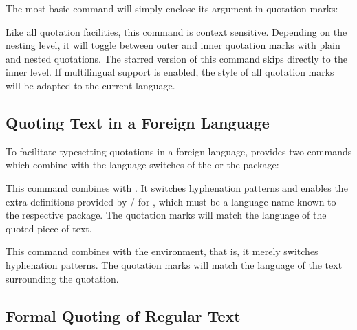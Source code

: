\documentclass{ltxdockit}[2010/09/26]
\begin{document}
The most basic command will simply enclose its argument in quotation marks:

\begin{ltxsyntax}


Like all quotation facilities, this command is context sensitive. Depending on the nesting level, it will toggle between outer and inner quotation marks with plain and nested quotations. The starred version of this command skips directly to the inner level. If multilingual support is enabled, the style of all quotation marks will be adapted to the current language.

\end{ltxsyntax}

\subsection{Quoting Text in a Foreign Language}
\label{bas:bbl}

To facilitate typesetting quotations in a foreign language,  provides two commands which combine  with the language switches of the  or the  package:

\begin{ltxsyntax}


This command combines  with . It switches hyphenation patterns and enables the extra definitions provided by \slash{} for , which must be a language name known to the respective package. The quotation marks will match the language of the quoted piece of text.


This command combines  with the  environment, that is, it merely switches hyphenation patterns. The quotation marks will match the language of the text surrounding the quotation.

\end{ltxsyntax}

\subsection{Formal Quoting of Regular Text}
\label{bas:txt:reg}
\end{document}
